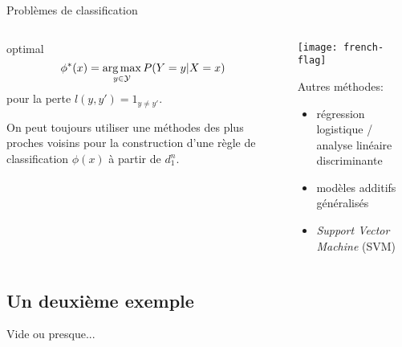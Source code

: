 \documentclass[unknownkeysallowed]{beamer}
\begin{document}
\begin{frame}{Problèmes de classification}
\begin{columns}
\begin{column}[T]{.48\textwidth}
	 optimal
	\begin{equation*}
	  \phi^*(x) = \mathop{\mathrm{arg\,max}}_{y\in \mathcal{Y}} P(Y=y|X=x)
	\end{equation*}
	pour la perte  $l(y,y')=1_{y\neq y'}$.

	\vspace{1cm}

	On peut toujours utiliser une méthodes
	des plus proches voisins pour la construction d'une règle de classification  $\widehat{\phi}(x)$ à partir de $d_1^n$.
\end{column}
\begin{column}[T]{.48\textwidth}
	\centering
	\texttt{[image: french-flag]}

	\vspace{1cm}

	Autres méthodes:
	\begin{itemize}
		\item régression logistique / analyse linéaire discriminante
		\item modèles additifs généralisés
		\item \emph{Support Vector Machine} (SVM)
	\end{itemize}
	\vspace{1cm}

\end{column}
\end{columns}
\end{frame}



\subsection{Un deuxième exemple}
\label{sub:deuxiem_exmple}



\begin{frame}{Vide}
	ou presque...
\end{frame}
\end{document}
